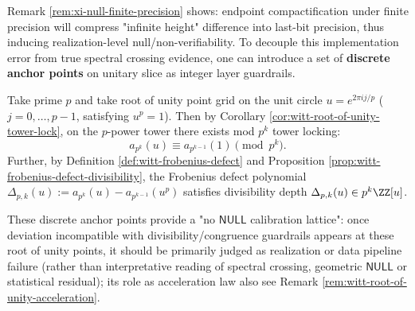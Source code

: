 \begin{remark}\label{rem:xi-null-frobenius-calibration}
Remark \ref{rem:xi-null-finite-precision} shows: endpoint compactification under finite precision will compress "infinite height" difference into last-bit precision, thus inducing realization-level null/non-verifiability.
To decouple this implementation error from true spectral crossing evidence, one can introduce a set of \textbf{discrete anchor points} on unitary slice as integer layer guardrails.
\par
Take prime \(p\) and take root of unity point grid on the unit circle
\(
u=e^{2\pi i j/p}
\)
(\(j=0,\dots,p-1\), satisfying \(u^p=1\)).
Then by Corollary \ref{cor:witt-root-of-unity-tower-lock}, on the \(p\)-power tower there exists mod \(p^k\) tower locking:
\[
a_{p^k}(u)\equiv a_{p^{k-1}}(1)\pmod{p^k}.
\]
Further, by Definition \ref{def:witt-frobenius-defect} and Proposition \ref{prop:witt-frobenius-defect-divisibility}, the Frobenius defect polynomial
\(
\Delta_{p,k}(u):=a_{p^k}(u)-a_{p^{k-1}}(u^p)
\)
satisfies divisibility depth
\(
\Delta_{p,k}(u)\in p^k\ZZ[u]
\).
\par
These discrete anchor points provide a "no \(\mathsf{NULL}\) calibration lattice": once deviation incompatible with divisibility/congruence guardrails appears at these root of unity points, it should be primarily judged as realization or data pipeline failure (rather than interpretative reading of spectral crossing, geometric \(\mathsf{NULL}\) or statistical residual); its role as acceleration law also see Remark \ref{rem:witt-root-of-unity-acceleration}.
\end{remark}

